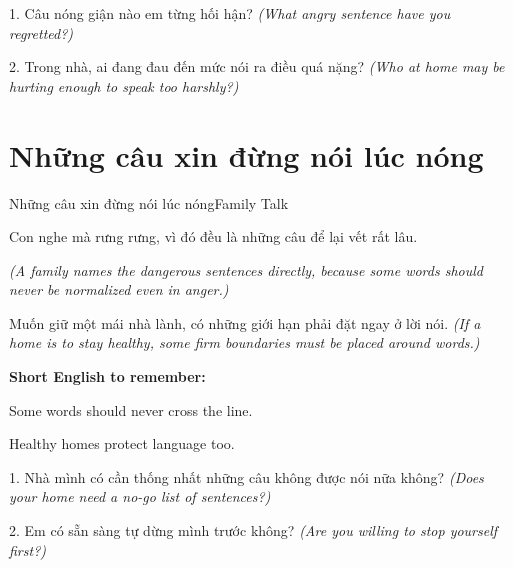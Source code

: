 \begin{tuhocnhanh}
1. Câu nóng giận nào em từng hối hận? \textit{(What angry sentence have you regretted?)}

2. Trong nhà, ai đang đau đến mức nói ra điều quá nặng? \textit{(Who at home may be hurting enough to speak too harshly?)}
\end{tuhocnhanh}
\ngancach

\section{Những câu xin đừng nói lúc nóng}
\begin{truyen}{Những câu xin đừng nói lúc nóng}{Family Talk}

Con nghe mà rưng rưng, vì đó đều là những câu để lại vết rất lâu.

\textit{(A family names the dangerous sentences directly, because some words should never be normalized even in anger.)}
\end{truyen}

\begin{baihoc}
Muốn giữ một mái nhà lành, có những giới hạn phải đặt ngay ở lời nói.
\textit{(If a home is to stay healthy, some firm boundaries must be placed around words.)}
\end{baihoc}

\begin{ghinhoanh}
\textbf{Short English to remember:}

Some words should never cross the line.

Healthy homes protect language too.
\end{ghinhoanh}

\begin{tuhocnhanh}
1. Nhà mình có cần thống nhất những câu không được nói nữa không? \textit{(Does your home need a no-go list of sentences?)}

2. Em có sẵn sàng tự dừng mình trước không? \textit{(Are you willing to stop yourself first?)}
\end{tuhocnhanh}
\ngancach